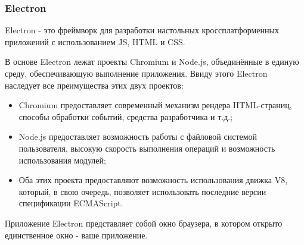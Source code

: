 \subsubsection{Electron}

Electron - это фреймворк для разработки настольных кроссплатформенных приложений с использованием JS, HTML и CSS.

В основе Electron лежат проекты Chromium и Node.js, объединённые в единую среду, обеспечивающую выполнение приложения. Ввиду этого Electron наследует все преимущества этих двух проектов:

\begin{itemize}
  \item Chromium предоставляет современный механизм рендера HTML-страниц, способы обработки событий, средства разработчика и т.д.;
  \item Node.js предоставляет возможность работы с файловой системой пользователя, высокую скорость выполнения операций и возможность использования модулей;
  \item Оба этих проекта предоставляют возможность использования движка V8, который, в свою очередь, позволяет использовать последние версии спецификации ECMAScript.
\end{itemize}

Приложение Electron представляет собой окно браузера, в котором открыто единственное окно - ваше приложение.
